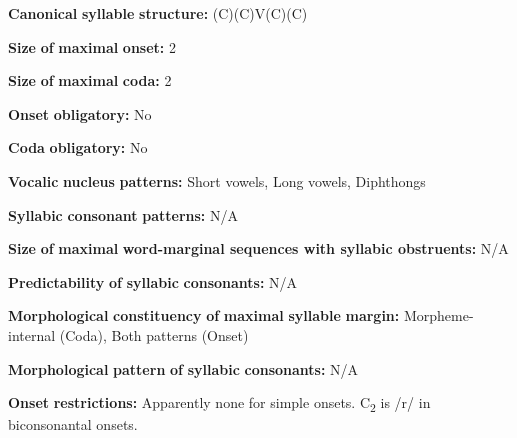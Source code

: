 \documentclass[output=paper]{langsci/langscibook}
\begin{document}
\begin{styleBody}
\textbf{Canonical} \textbf{syllable} \textbf{structure:} (C)(C)V(C)(C) \citep[20-21]{Holt1999}
\end{styleBody}

\begin{styleBody}
\textbf{Size} \textbf{of} \textbf{maximal} \textbf{onset:} 2
\end{styleBody}

\begin{styleBody}
\textbf{Size} \textbf{of} \textbf{maximal} \textbf{coda:} 2
\end{styleBody}

\begin{styleBody}
\textbf{Onset} \textbf{obligatory:} No
\end{styleBody}

\begin{styleBody}
\textbf{Coda} \textbf{obligatory:} No
\end{styleBody}

\begin{styleBody}
\textbf{Vocalic} \textbf{nucleus} \textbf{patterns:} Short vowels, Long vowels, Diphthongs
\end{styleBody}

\begin{styleBody}
\textbf{Syllabic} \textbf{consonant} \textbf{patterns:} N/A
\end{styleBody}

\begin{styleBody}
\textbf{Size} \textbf{of} \textbf{maximal} \textbf{word{}-marginal sequences with syllabic obstruents:} N/A
\end{styleBody}

\begin{styleBody}
\textbf{Predictability} \textbf{of} \textbf{syllabic} \textbf{consonants:} N/A
\end{styleBody}

\begin{styleBody}
\textbf{Morphological} \textbf{constituency} \textbf{of} \textbf{maximal} \textbf{syllable} \textbf{margin:} Morpheme-internal (Coda), Both patterns (Onset)
\end{styleBody}

\begin{styleBody}
\textbf{Morphological} \textbf{pattern} \textbf{of} \textbf{syllabic} \textbf{consonants:} N/A
\end{styleBody}

\begin{styleBody}
\textbf{Onset} \textbf{restrictions:} Apparently none for simple onsets. C\textsubscript{2} is /r/ in biconsonantal onsets.
\end{styleBody}
\end{document}
